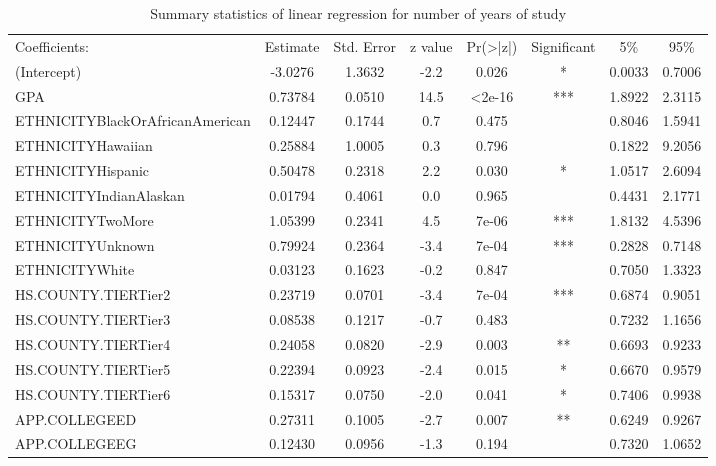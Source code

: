\documentclass[12pt,english]{report}
\begin{document}
\begin{table}[H]
\centering
\caption{Summary statistics of linear regression for number of years of study }
\label{LR_num_years}
\begin{adjustbox}{width=0.95\textwidth}
\begin{tabular}{|lccccccc|} \hline %
Coefficients:                   & Estimate & Std. Error & z value & Pr(\textgreater|z|) & Significant & 5\%    & 95\%   \\

(Intercept)                    &  -3.0276 & 1.3632  & -2.2  &  0.026 & *  &0.0033 & 0.7006 \\  
GPA                            &  0.73784 & 0.0510  & 14.5  & <2e-16 & ***&1.8922 & 2.3115 \\
ETHNICITYBlackOrAfricanAmerican&  0.12447 & 0.1744  &  0.7  &  0.475 &    &0.8046 & 1.5941 \\
ETHNICITYHawaiian              &  0.25884 & 1.0005 &   0.3  &  0.796 &    &0.1822 & 9.2056 \\
ETHNICITYHispanic              &  0.50478 & 0.2318 &   2.2  &  0.030 & *  &1.0517 & 2.6094 \\
ETHNICITYIndianAlaskan         &  0.01794 & 0.4061 &   0.0  &  0.965 &    &0.4431 & 2.1771 \\
ETHNICITYTwoMore               &  1.05399 & 0.2341 &   4.5  &  7e-06 & ***&1.8132 & 4.5396 \\
ETHNICITYUnknown               &  0.79924 & 0.2364 &  -3.4  &  7e-04 & ***&0.2828 & 0.7148 \\
ETHNICITYWhite                 &  0.03123 & 0.1623 &  -0.2  &  0.847 &    &0.7050 & 1.3323 \\
HS.COUNTY.TIERTier2            &  0.23719 & 0.0701 &  -3.4  &  7e-04 & ***&0.6874 & 0.9051 \\
HS.COUNTY.TIERTier3            &  0.08538 & 0.1217 &  -0.7  &  0.483 &    &0.7232 & 1.1656 \\
HS.COUNTY.TIERTier4            &  0.24058 & 0.0820 &  -2.9  &  0.003 & ** &0.6693 & 0.9233 \\
HS.COUNTY.TIERTier5            &  0.22394 & 0.0923 &  -2.4  &  0.015 & *  &0.6670 & 0.9579 \\
HS.COUNTY.TIERTier6            &  0.15317 & 0.0750 &  -2.0  &  0.041 & *  &0.7406 & 0.9938 \\
APP.COLLEGEED                  &  0.27311 & 0.1005 &  -2.7  &  0.007 & ** &0.6249 & 0.9267 \\
APP.COLLEGEEG                  &  0.12430 & 0.0956 &  -1.3  &  0.194 &    &0.7320 & 1.0652 \\

\end{tabular}
\end{adjustbox}
\end{table}
\end{document}
